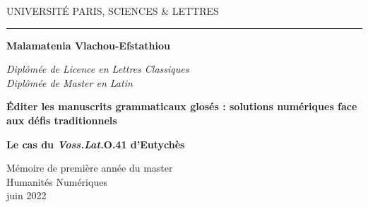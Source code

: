 \documentclass[a4paper, twoside, 12pt]{book}
\begin{document}
\frontmatter



\begin{titlepage}
\begin{center}

\bigskip

\begin{large}
UNIVERSITÉ PARIS, SCIENCES \& LETTRES
\end{large}

\begin{center}\rule{2cm}{0.02cm}\end{center}

\bigskip
\bigskip
\bigskip
\begin{Large}
\textbf{Malamatenia Vlachou-Efstathiou}\\
\end{Large}
\begin{normalsize}
\textit{Diplômée de Licence en Lettres Classiques}\\
\textit{Diplômée de Master en Latin}\\
\end{normalsize}

\bigskip
\bigskip
\bigskip

\begin{Huge}
\textbf{Éditer les manuscrits grammaticaux glosés : solutions numériques face aux défis traditionnels}\\
\end{Huge}

\bigskip
\bigskip
\begin{LARGE}
\textbf{Le cas du \textit{Voss.Lat.}O.41 d'Eutychès}\\
\end{LARGE}

\bigskip
\bigskip
\bigskip
\vfill

\begin{large}
Mémoire de première année du master\\
\og Humanités Numériques \fg{} \\
\bigskip
juin 2022
\end{large}

\end{center}
\end{titlepage}
\end{document}
